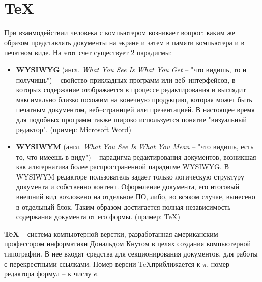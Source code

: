 \section{\TeX}
При взаимодействии человека с компьютером возникает вопрос: каким же образом представлять документы на экране и затем в памяти компьютера и в печатном виде. На этот счет существует 2 парадигмы:
\begin{itemize}
\item \textbf{WYSIWYG} (англ. \emph{What You See Is What You Get} -- "что видишь, то и получишь") -- свойство прикладных программ или веб--интерфейсов, в которых содержание отображается в процессе редактирования и выглядит максимально близко похожим на конечную продукцию, которая может быть печатным документом, веб--страницей или презентацией. В настоящее время для подобных программ также широко используется понятие "визуальный редактор". (пример: Microsoft Word)
\item \textbf{WYSIWYM} (англ. \emph{What You See Is What You Mean} -- "что видишь, есть то, что имеешь в виду") -- парадигма редактирования документов, возникшая как альтернатива более распространенной парадигме WYSIWYG. В WYSIWYM редакторе пользователь задает только логическую структуру документа и собственно контент. Оформление документа, его итоговый внешний вид возложено на отдельное ПО, либо, во всяком случае, вынесено в отдельный блок. Таким образом достигается полная независимость содержания документа
от его формы. (пример: \TeX)
\end{itemize}
\textbf{\TeX} -- система компьютерной верстки, разработанная американским профессором информатики Дональдом Кнутом в целях создания компьютерной типографии. В нее входят средства для секционирования документов, для работы с перекрестными ссылками. Номер версии \TeX приближается к $\pi$, номер редактора формул -- к числу $e$.
